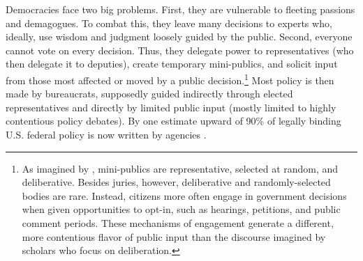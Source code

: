 
Democracies face two big problems. First, they are vulnerable to fleeting passions and demagogues. To combat this, they leave many decisions to experts who, ideally, use wisdom and judgment loosely guided by the public. Second, everyone cannot vote on every decision. Thus, they delegate power to representatives (who then delegate it to deputies), create temporary mini-publics,
and solicit input from those most affected or moved by a public decision.\footnote{
As imagined by \citet{Dahl1989}, mini-publics are representative, selected at random, and deliberative. Besides juries, however, deliberative and randomly-selected bodies are rare. Instead, citizens more often engage in government decisions when given opportunities to opt-in, such as hearings, petitions, and public comment periods. These mechanisms of engagement generate a different, more contentious flavor of public input than the discourse imagined by scholars who focus on deliberation.
}
Most policy is then made by bureaucrats, supposedly guided indirectly through elected representatives and directly by limited public input (mostly limited to highly contentious policy debates).
By one estimate upward of 90\% of legally binding U.S. federal policy is now written by agencies \citep{West2013}.



